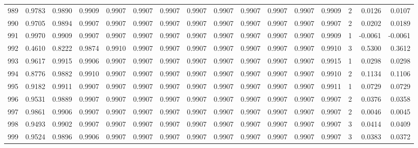\begin{tabular}{lrrrrrrrrrrrrrrr}
989 &      0.9783 &  0.9890 &  0.9909 &  0.9907 &  0.9907 &  0.9907 &  0.9907 &  0.9907 &  0.9907 &  0.9907 &   0.9907 &     0.9909 &      2 &                    0.0126 &                     0.0107 \\
990 &      0.9705 &  0.9894 &  0.9907 &  0.9907 &  0.9907 &  0.9907 &  0.9907 &  0.9907 &  0.9907 &  0.9907 &   0.9907 &     0.9907 &      2 &                    0.0202 &                     0.0189 \\
991 &      0.9970 &  0.9909 &  0.9907 &  0.9907 &  0.9907 &  0.9907 &  0.9907 &  0.9907 &  0.9907 &  0.9907 &   0.9907 &     0.9909 &      1 &                   -0.0061 &                    -0.0061 \\
992 &      0.4610 &  0.8222 &  0.9874 &  0.9910 &  0.9907 &  0.9907 &  0.9907 &  0.9907 &  0.9907 &  0.9907 &   0.9907 &     0.9910 &      3 &                    0.5300 &                     0.3612 \\
993 &      0.9617 &  0.9915 &  0.9906 &  0.9907 &  0.9907 &  0.9907 &  0.9907 &  0.9907 &  0.9907 &  0.9907 &   0.9907 &     0.9915 &      1 &                    0.0298 &                     0.0298 \\
994 &      0.8776 &  0.9882 &  0.9910 &  0.9907 &  0.9907 &  0.9907 &  0.9907 &  0.9907 &  0.9907 &  0.9907 &   0.9907 &     0.9910 &      2 &                    0.1134 &                     0.1106 \\
995 &      0.9182 &  0.9911 &  0.9907 &  0.9907 &  0.9907 &  0.9907 &  0.9907 &  0.9907 &  0.9907 &  0.9907 &   0.9907 &     0.9911 &      1 &                    0.0729 &                     0.0729 \\
996 &      0.9531 &  0.9889 &  0.9907 &  0.9907 &  0.9907 &  0.9907 &  0.9907 &  0.9907 &  0.9907 &  0.9907 &   0.9907 &     0.9907 &      2 &                    0.0376 &                     0.0358 \\
997 &      0.9861 &  0.9906 &  0.9907 &  0.9907 &  0.9907 &  0.9907 &  0.9907 &  0.9907 &  0.9907 &  0.9907 &   0.9907 &     0.9907 &      2 &                    0.0046 &                     0.0045 \\
998 &      0.9493 &  0.9902 &  0.9907 &  0.9907 &  0.9907 &  0.9907 &  0.9907 &  0.9907 &  0.9907 &  0.9907 &   0.9907 &     0.9907 &      3 &                    0.0414 &                     0.0409 \\
999 &      0.9524 &  0.9896 &  0.9906 &  0.9907 &  0.9907 &  0.9907 &  0.9907 &  0.9907 &  0.9907 &  0.9907 &   0.9907 &     0.9907 &      3 &                    0.0383 &                     0.0372 \\
\bottomrule
\end{tabular}
